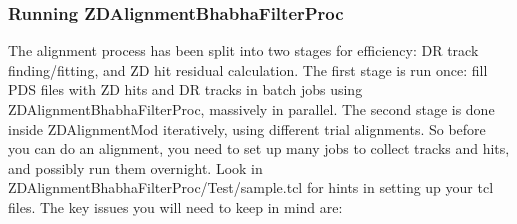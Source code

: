 \documentclass[12pt]{article}
\begin{document}
\subsubsection{Running ZDAlignmentBhabhaFilterProc}

The alignment process has been split into two stages for efficiency:
DR track finding/fitting, and ZD hit residual calculation.  The first
stage is run once: fill PDS files with ZD hits and DR tracks in batch
jobs using ZDAlignmentBhabhaFilterProc, massively in parallel.  The
second stage is done inside ZDAlignmentMod iteratively, using
different trial alignments.  So before you can do an alignment, you
need to set up many jobs to collect tracks and hits, and possibly run
them overnight.  Look in ZDAlignmentBhabhaFilterProc/Test/sample.tcl
for hints in setting up your tcl files.  The key issues you will need
to keep in mind are:
\end{document}
